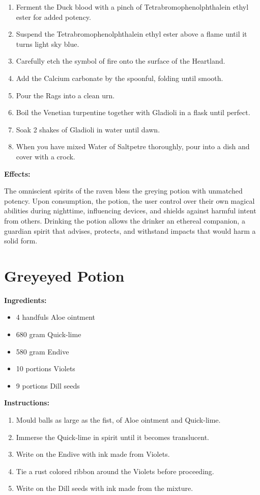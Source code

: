 \documentclass{article}
\begin{document}
\begin{enumerate}
  \item Ferment the Duck blood with a pinch of Tetrabromophenolphthalein ethyl ester for added potency.
  \item Suspend the Tetrabromophenolphthalein ethyl ester above a flame until it turns light sky blue.
  \item Carefully etch the symbol of fire onto the surface of the Heartland.
  \item Add the Calcium carbonate by the spoonful, folding until smooth.
  \item Pour the Rags into a clean urn.
  \item Boil the Venetian turpentine together with Gladioli in a flask until perfect.
  \item Soak 2 shakes of Gladioli in water until dawn.
  \item When you have mixed Water of Saltpetre thoroughly, pour into a dish and cover with a crock.
\end{enumerate}

\textbf{Effects:}

The omniscient spirits of the raven bless the greying potion with unmatched potency. Upon consumption, the potion, the user control over their own magical abilities during nighttime, influencing devices, and shields against harmful intent from others. Drinking the potion allows the drinker an ethereal companion, a guardian spirit that advises, protects, and withstand impacts that would harm a solid form.

\newpage
\section*{Greyeyed Potion}

\textbf{Ingredients:}

\begin{itemize}
  \item 4 handfuls Aloe ointment
  \item 680 gram Quick-lime
  \item 580 gram Endive
  \item 10 portions Violets
  \item 9 portions Dill seeds
\end{itemize}

\textbf{Instructions:}

\begin{enumerate}
  \item Mould balls as large as the fist, of Aloe ointment and Quick-lime.
  \item Immerse the Quick-lime in spirit until it becomes translucent.
  \item Write on the Endive with ink made from Violets.
  \item Tie a rust colored ribbon around the Violets before proceeding.
  \item Write on the Dill seeds with ink made from the mixture.
\end{enumerate}
\end{document}
